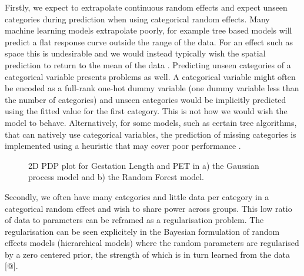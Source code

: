 \documentclass[10pt,]{article}
\begin{document}
Firstly, we expect to extrapolate continuous random effects and expect unseen categories during prediction when using categorical random effects. Many machine learning models extrapolate poorly, for example tree based models will predict a flat response curve outside the range of the data. For an effect such as space this is undesirable and we would instead typically wish the spatial prediction to return to the mean of the data \citep{gpmean}. Predicting unseen categories of a categorical variable presents problems as well. A categorical variable might often be encoded as a full-rank one-hot dummy variable (one dummy variable less than the number of categories) and unseen categories would be implicitly predicted using the fitted value for the first category. This is not how we would wish the model to behave. Alternatively, for some models, such as certain tree algorithms, that can natively use categorical variables, the prediction of missing categories is implemented using a heuristic that may cover poor performance \citep{missingscats}.

\begin{figure}[t!]
  \centering


  \label{fig:2d}
  \caption{
    2D PDP plot for Gestation Length and PET in a) the Gaussian process model and b) the Random Forest model. 
  }
\end{figure}

Secondly, we often have many categories and little data per category in a categorical random effect and wish to share power across groups. This low ratio of data to parameters can be reframed as a regularisation problem. The regularisation can be seen explicitely in the Bayesian formulation of random effects models (hierarchical models) where the random parameters are regularised by a zero centered prior, the strength of which is in turn learned from the data {[}@{]}.
\end{document}
